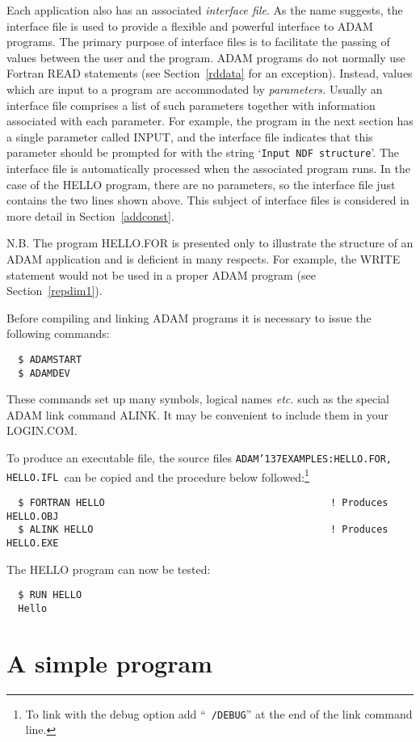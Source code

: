 \documentclass[twoside,11pt]{article}
\renewcommand{\_}{{\tt\char'137}}
\newcommand{\xlabel}[1]{}
\begin{document}
Each application also has an associated {\sl interface file}.
As the name suggests, the interface file is used to provide a flexible
and powerful interface to  ADAM programs.
The primary purpose of interface files is to facilitate the passing
of values between the user and the program.
ADAM programs do not normally use Fortran READ statements
(see Section~\ref{rddata} for an exception).
Instead, values which are input to  a program are accommodated by
{\sl parameters.}
Usually an interface file comprises  a list of
such parameters together with information associated with each parameter.
For example, the program in the next section has a single parameter
called INPUT, and the interface file indicates that this  parameter should
be prompted for with the string `{\tt Input NDF structure}'.
The interface file is automatically processed when the associated program
runs.
In the case of the HELLO program, there are no parameters, so the interface
file just contains the two lines shown above.
This subject of interface files is considered in more detail in
Section~\ref{addconst}.

N.B. The program HELLO.FOR is presented only to illustrate the
structure of an ADAM application and is deficient in many respects.
For example, the WRITE statement would not be used in
a proper ADAM program (see Section~\ref{repdim1}).

Before compiling and linking ADAM programs it is necessary to issue the
following commands:
\begin{verbatim}
  $ ADAMSTART
  $ ADAMDEV
\end{verbatim}
These commands set up many symbols, logical names {\it etc.}
such as the special ADAM link command ALINK.
It may be convenient to include them in your LOGIN.COM.

To produce an executable file, the
source files {\tt ADAM\_EXAMPLES:HELLO.FOR, HELLO.IFL}\ can be copied and the
procedure below  followed:\footnote{To link with the debug option add
``{\tt~/DEBUG}'' at the end of the link
command line.}
\begin{verbatim}
  $ FORTRAN HELLO                                       ! Produces HELLO.OBJ
  $ ALINK HELLO                                         ! Produces HELLO.EXE
\end{verbatim}
The HELLO program can now be tested:
\begin{verbatim}
  $ RUN HELLO
  Hello
\end{verbatim}

\newpage
\section{A simple program\label{repdim}\xlabel{a_simple_program}}
\end{document}
